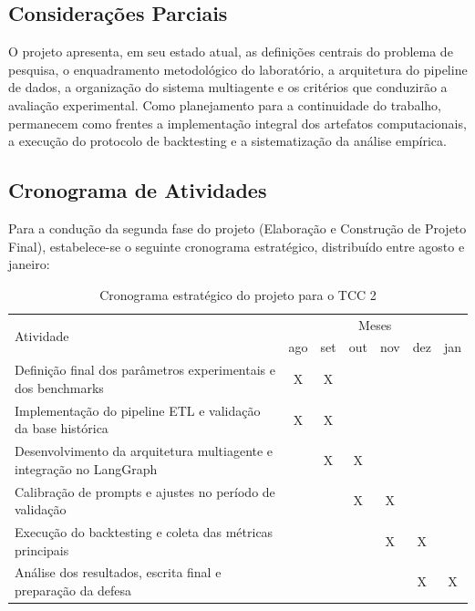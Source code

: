 \documentclass{eic-bcc-tcc}
\begin{document}
\subsection{Considerações Parciais}

O projeto apresenta, em seu estado atual, as definições centrais do problema de pesquisa, o enquadramento metodológico do laboratório, a arquitetura do pipeline de dados, a organização do sistema multiagente e os critérios que conduzirão a avaliação experimental. Como planejamento para a continuidade do trabalho, permanecem como frentes a implementação integral dos artefatos computacionais, a execução do protocolo de backtesting e a sistematização da análise empírica.

\subsection{Cronograma de Atividades}

Para a condução da segunda fase do projeto (Elaboração e Construção de Projeto Final), estabelece-se o seguinte cronograma estratégico, distribuído entre agosto e janeiro:

\begin{table}[!ht]
\centering
\caption{Cronograma estratégico do projeto para o TCC 2}
\label{tab:cronograma_detalhado}
\scriptsize{
\begin{tabular}{l c c c c c c}
\toprule
\multirow{2}{*}{Atividade} & \multicolumn{6}{c}{Meses} \\
& ago & set & out & nov & dez & jan \\
\midrule
Definição final dos parâmetros experimentais e dos benchmarks & X & X & & & & \\
Implementação do pipeline ETL e validação da base histórica & X & X & & & & \\
Desenvolvimento da arquitetura multiagente e integração no LangGraph & & X & X & & & \\
Calibração de prompts e ajustes no período de validação & & & X & X & & \\
Execução do backtesting e coleta das métricas principais & & & & X & X & \\
Análise dos resultados, escrita final e preparação da defesa & & & & & X & X \\
\bottomrule
\end{tabular}
}
\end{table}

\backmatter

\end{document}
